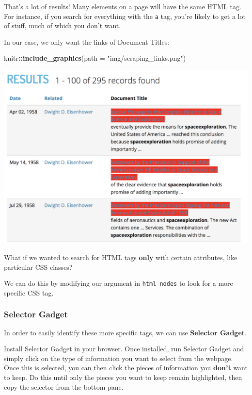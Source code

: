 \documentclass[]{book}
\newenvironment{Shaded}{\begin{snugshade}}{\end{snugshade}}
\newcommand{\KeywordTok}[1]{\textcolor[rgb]{0.13,0.29,0.53}{\textbf{#1}}}
\newcommand{\DataTypeTok}[1]{\textcolor[rgb]{0.13,0.29,0.53}{#1}}
\newcommand{\StringTok}[1]{\textcolor[rgb]{0.31,0.60,0.02}{#1}}
\newcommand{\OperatorTok}[1]{\textcolor[rgb]{0.81,0.36,0.00}{\textbf{#1}}}
\newcommand{\NormalTok}[1]{#1}
\begin{document}
That's a lot of results! Many elements on a page will have the same HTML
tag. For instance, if you search for everything with the \texttt{a} tag,
you're likely to get a lot of stuff, much of which you don't want.

In our case, we only want the links of Document Titles:

\begin{Shaded}
\begin{Highlighting}[]
\NormalTok{knitr}\OperatorTok{::}\KeywordTok{include_graphics}\NormalTok{(}\DataTypeTok{path =} \StringTok{"img/scraping_links.png"}\NormalTok{)}
\end{Highlighting}
\end{Shaded}

\begin{center}\includegraphics[width=0.7\linewidth]{img/scraping_links} \end{center}

What if we wanted to search for HTML tags \textbf{only} with certain
attributes, like particular CSS classes?

We can do this by modifying our argument in \texttt{html\_nodes} to look
for a more specific CSS tag.

\subsubsection*{Selector Gadget}\label{selector-gadget}

In order to easily identify these more specific tags, we can use
\textbf{Selector Gadget}.

Install Selector Gadget in your browser. Once installed, run Selector
Gadget and simply click on the type of information you want to select
from the webpage. Once this is selected, you can then click the pieces
of information you \textbf{don't} want to keep. Do this until only the
pieces you want to keep remain highlighted, then copy the selector from
the bottom pane.
\end{document}
